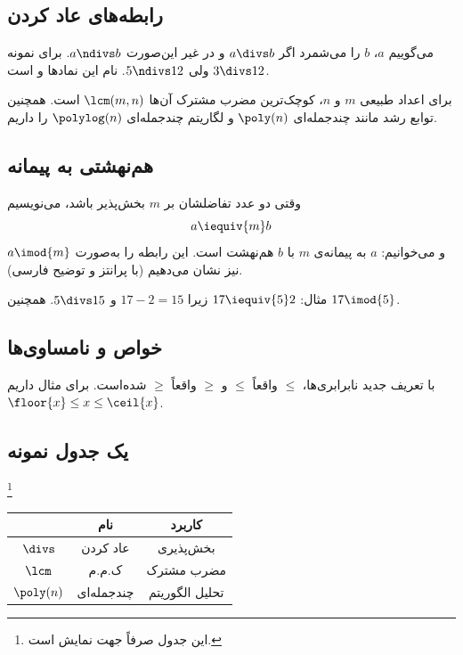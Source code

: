 
\subsection{رابطه‌های عاد کردن}
می‌گوییم $a$، $b$ را می‌شمرد اگر $a \divs b$ و در غیر این‌صورت $a \ndivs b$.
برای نمونه $3 \divs 12$ ولی $5 \ndivs 12$. نام این نمادها  و  است.

برای اعداد طبیعی $m$ و $n$، کوچک‌ترین مضرب مشترک آن‌ها $\lcm(m,n)$ است.
همچنین توابع رشد مانند چندجمله‌ای $\poly(n)$ و لگاریتم چندجمله‌ای $\polylog(n)$ را داریم.

\subsection{هم‌نهشتی به پیمانه}
وقتی دو عدد تفاضلشان بر $m$ بخش‌پذیر باشد، می‌نویسیم
\[
	a \iequiv{m} b
\]
و می‌خوانیم: $a$ به پیمانه‌ی $m$ با $b$ هم‌نهشت است. این رابطه را به‌صورت $a \imod{m}$ نیز نشان می‌دهیم (با پرانتز و توضیح فارسی).

مثال: $17 \iequiv{5} 2$ زیرا $17-2 = 15$ و $5 \divs 15$. همچنین $17 \imod{5}$.

\subsection{خواص و نامساوی‌ها}
با تعریف جدید نابرابری‌ها، $\leq$ واقعاً $\leqslant$ و $\geq$ واقعاً $\geqslant$ شده‌است.
برای مثال داریم $\floor{x} \leq x \leq \ceil{x}$.

\subsection{یک جدول نمونه}\footnote{این جدول صرفاً جهت نمایش است.}
\begin{center}
	\begin{tabular}{|c|c|c|}
		\hline
		\lr{Symbol} & نام       & کاربرد         \\
		\hline
		$\divs$     & عاد کردن  & بخش‌پذیری       \\
		$\lcm$      & ک.م.م     & مضرب مشترک     \\
		$\poly(n)$  & چندجمله‌ای & تحلیل الگوریتم \\
		\hline
	\end{tabular}
\end{center}